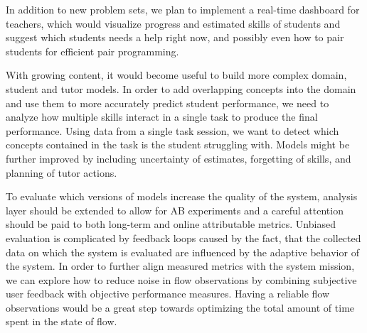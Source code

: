 In addition to new problem sets, we plan to implement a real-time dashboard for teachers,
which would visualize progress and estimated skills of students and suggest
which students needs a help right now, and possibly even how to pair students
for efficient pair programming.

With growing content, it would become useful to build more complex
domain, student and tutor models. In order to add overlapping concepts
into the domain and use them to more accurately predict student performance,
we need to analyze how multiple skills interact in a single
task to produce the final performance. %
Using data from a single task session,
we want to detect which concepts contained in the task
is the student struggling with.
Models might be further improved by including uncertainty of estimates,
forgetting of skills, and planning of tutor actions.

To evaluate which versions of models increase the quality of the system,
analysis layer should be extended to allow for AB experiments
and a careful attention should be paid to both long-term and
online attributable metrics.
Unbiased evaluation is complicated by feedback loops caused by the fact, that
the collected data on which the system is evaluated are influenced by the
adaptive behavior of the system.
In order to further align measured metrics with the system mission,
we can explore how to reduce noise in flow observations
by combining subjective user feedback with objective performance measures.
Having a reliable flow observations would be a great step towards optimizing
the total amount of time spent in the state of flow.

